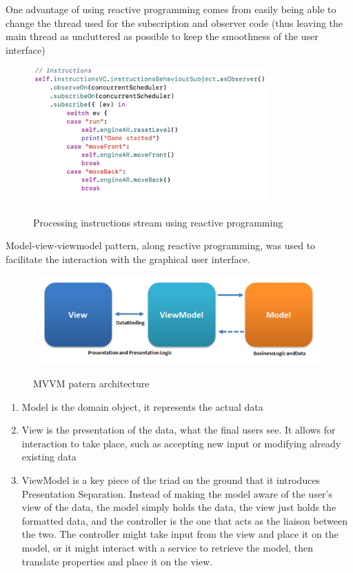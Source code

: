 \documentclass[12 pct]{report}
\begin{document}
One advantage of using reactive programming comes from easily being able to change the thread used for the subscription and observer code (thus leaving the main thread as uncluttered as possible to keep the smoothness of the user interface)
\begin{figure}[H]
\includegraphics[width=0.8\textwidth]{reactive-instructions}
\centering
\label{fig:reactive-repository}
\caption{Processing instructions stream using reactive programming}
\end{figure}

Model-view-viewmodel pattern, along reactive programming, was used to facilitate the interaction with the graphical user interface.

\begin{figure}[H]
\includegraphics[width=1.0\textwidth]{mvvm}
\centering
\label{fig:reactive-repository}
\caption{MVVM patern architecture }
\end{figure}

\begin{enumerate}
\item Model is the domain object, it represents the actual data 
\item View is the presentation of the data, what the final users see. It allows for interaction to take place, such as accepting new input or  modifying already existing data
\item ViewModel is a key piece of the triad on the ground that it introduces Presentation Separation.  Instead of making the model aware of the user’s view of the data, the model simply holds the data, the view just holds the formatted data, and the controller is the one that acts as the liaison between the two. The controller might take input from the view and place it on the model, or it might interact with a service to retrieve the model, then translate properties and place it on the view.
\end{enumerate}
\end{document}
